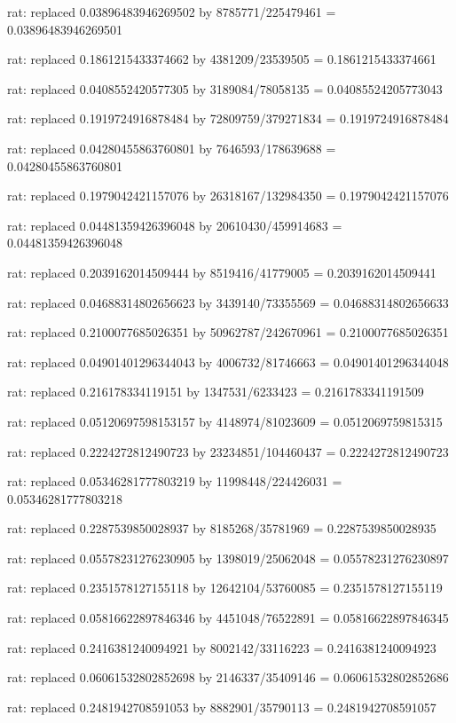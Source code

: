 \documentclass[a4paper,10pt]{article}
\begin{document}
\begin{eulernotebook}
\begin{eulercomment}
\begin{eulercomment}
\begin{eulercomment}
\begin{eulercomment}
\begin{eulercomment}
\begin{eulercomment}
\begin{eulercomment}
\begin{eulercomment}
\begin{eulercomment}
\begin{eulercomment}
\begin{eulercomment}
\begin{eulercomment}
\begin{eulercomment}
\begin{eulercomment}
\begin{eulercomment}
\begin{eulercomment}
\begin{euleroutput}
  rat: replaced 0.03896483946269502 by 8785771/225479461 = 0.03896483946269501
  
  rat: replaced 0.1861215433374662 by 4381209/23539505 = 0.1861215433374661
  
  rat: replaced 0.0408552420577305 by 3189084/78058135 = 0.04085524205773043
  
  rat: replaced 0.1919724916878484 by 72809759/379271834 = 0.1919724916878484
  
  rat: replaced 0.04280455863760801 by 7646593/178639688 = 0.04280455863760801
  
  rat: replaced 0.1979042421157076 by 26318167/132984350 = 0.1979042421157076
  
  rat: replaced 0.04481359426396048 by 20610430/459914683 = 0.04481359426396048
  
  rat: replaced 0.2039162014509444 by 8519416/41779005 = 0.2039162014509441
  
  rat: replaced 0.04688314802656623 by 3439140/73355569 = 0.04688314802656633
  
  rat: replaced 0.2100077685026351 by 50962787/242670961 = 0.2100077685026351
  
  rat: replaced 0.04901401296344043 by 4006732/81746663 = 0.04901401296344048
  
  rat: replaced 0.216178334119151 by 1347531/6233423 = 0.2161783341191509
  
  rat: replaced 0.05120697598153157 by 4148974/81023609 = 0.0512069759815315
  
  rat: replaced 0.2224272812490723 by 23234851/104460437 = 0.2224272812490723
  
  rat: replaced 0.05346281777803219 by 11998448/224426031 = 0.05346281777803218
  
  rat: replaced 0.2287539850028937 by 8185268/35781969 = 0.2287539850028935
  
  rat: replaced 0.05578231276230905 by 1398019/25062048 = 0.05578231276230897
  
  rat: replaced 0.2351578127155118 by 12642104/53760085 = 0.2351578127155119
  
  rat: replaced 0.05816622897846346 by 4451048/76522891 = 0.05816622897846345
  
  rat: replaced 0.2416381240094921 by 8002142/33116223 = 0.2416381240094923
  
  rat: replaced 0.06061532802852698 by 2146337/35409146 = 0.06061532802852686
  
  rat: replaced 0.2481942708591053 by 8882901/35790113 = 0.2481942708591057
  

\end{euleroutput}
\end{eulercomment}
\end{eulercomment}
\end{eulercomment}
\end{eulercomment}
\end{eulercomment}
\end{eulercomment}
\end{eulercomment}
\end{eulercomment}
\end{eulercomment}
\end{eulercomment}
\end{eulercomment}
\end{eulercomment}
\end{eulercomment}
\end{eulercomment}
\end{eulercomment}
\end{eulercomment}
\end{eulernotebook}
\end{document}
